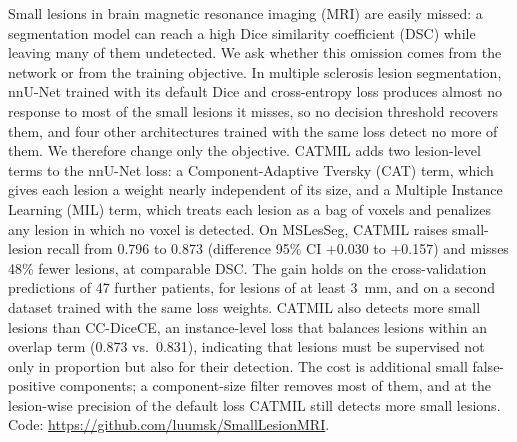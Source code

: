 Small lesions in brain magnetic resonance imaging (MRI) are easily missed: a segmentation model can reach a high Dice similarity coefficient (DSC) while leaving many of them undetected. We ask whether this omission comes from the network or from the training objective. In multiple sclerosis lesion segmentation, nnU-Net trained with its default Dice and cross-entropy loss produces almost no response to most of the small lesions it misses, so no decision threshold recovers them, and four other architectures trained with the same loss detect no more of them. We therefore change only the objective. CATMIL adds two lesion-level terms to the nnU-Net loss: a Component-Adaptive Tversky (CAT) term, which gives each lesion a weight nearly independent of its size, and a Multiple Instance Learning (MIL) term, which treats each lesion as a bag of voxels and penalizes any lesion in which no voxel is detected. On MSLesSeg, CATMIL raises small-lesion recall from 0.796 to 0.873 (difference 95\% CI +0.030 to +0.157) and misses 48\% fewer lesions, at comparable DSC. The gain holds on the cross-validation predictions of 47 further patients, for lesions of at least 3~mm, and on a second dataset trained with the same loss weights. CATMIL also detects more small lesions than CC-DiceCE, an instance-level loss that balances lesions within an overlap term (0.873 vs.\ 0.831), indicating that lesions must be supervised not only in proportion but also for their detection. The cost is additional small false-positive components; a component-size filter removes most of them, and at the lesion-wise precision of the default loss CATMIL still detects more small lesions. Code: \url{https://github.com/luumsk/SmallLesionMRI}.
